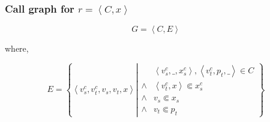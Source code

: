 \begin{frame}

\frametitle{Call graph for $r=\left\langle C,x\right\rangle$}

\begin{center}

$$G=\left\langle C,E\right\rangle$$

where,

$$E = \left\{ \left\langle v^c_s,v^c_t,v_s,v_t,x \right\rangle \left|
\begin{array}{ll}
&\left\langle v^c_s, \_, x^c_s \right\rangle, \left\langle v^c_t, p_t, \_
\right\rangle \in C\\
\wedge & \left\langle v^c_t, x \right\rangle\Subset x^c_s\\
\wedge & v_s \Subset x_s\\
\wedge & v_t \Subset p_t
\end{array}\right.\right\}$$

\end{center}

\end{frame}
